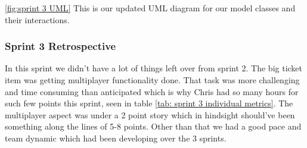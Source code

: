 \noindent \ref{fig:sprint 3 UML} This is our updated UML diagram for our model classes and their interactions.


\subsubsection{Sprint 3 Retrospective}
In this sprint we didn't have a lot of things left over from sprint 2. The big ticket item was getting multiplayer functionality done. That task was more challenging and time consuming than anticipated which is why Chris had so many hours for such few points this sprint, seen in table \ref{tab: sprint 3 individual metrics}. The multiplayer aspect was under a 2 point story which in hindsight should've been something along the lines of 5-8 points. Other than that we had a good pace and team dynamic which had been developing over the 3 sprints.


